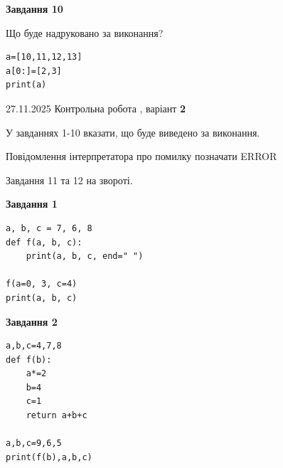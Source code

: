 \documentclass[12pt, ukrainian]{article}
\begin{document}
{{\begin{minipage}[t]{10.5cm}
\begin{center}
\textbf{Завдання 10}
\end{center}
Що буде надруковано за виконання?\par
\begin{verbatim}
a=[10,11,12,13]
a[0:]=[2,3]
print(a)
\end{verbatim}

\end{minipage}

}
\newpage

{{ 27.11.2025 Контрольна робота , варіант  \No \textbf { 2 }\par}}
{

{%



У завданнях 1-10 вказати, що буде виведено за виконання.

Повідомлення інтерпретатора про помилку позначати ERROR

Завдання 11 та 12 на звороті.

\begin{minipage}[t]{7.5cm}

\begin{center}
\textbf{Завдання 1}
\end{center}

\begin{verbatim}
a, b, c = 7, 6, 8
def f(a, b, c):
    print(a, b, c, end=" ")

f(a=0, 3, c=4)
print(a, b, c)
\end{verbatim}



\begin{center}
\textbf{Завдання 2}
\end{center}

\begin{verbatim}
a,b,c=4,7,8
def f(b):
    a*=2
    b=4
    c=1
    return a+b+c

a,b,c=9,6,5
print(f(b),a,b,c)
\end{verbatim}




\end{minipage}}}}
\end{document}
